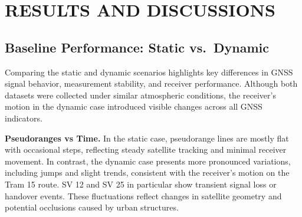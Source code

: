 
\section{RESULTS AND DISCUSSIONS} \label{sec:results}

    \subsection{Baseline Performance: Static vs.\ Dynamic}

        Comparing the static and dynamic scenarios highlights key differences in GNSS signal behavior, measurement stability, and receiver performance. 
        Although both datasets were collected under similar atmospheric conditions, the receiver's motion in the dynamic case introduced visible changes across all GNSS indicators.
    
        \vspace{0.5em}
        \textbf{Pseudoranges vs Time.} 
        In the static case, pseudorange lines are mostly flat with occasional steps, reflecting steady satellite tracking and minimal receiver movement. 
        In contrast, the dynamic case presents more pronounced variations, including jumps and slight trends, consistent with the receiver's motion on the Tram 15 route. 
        SV 12 and SV 25 in particular show transient signal loss or handover events. 
        These fluctuations reflect changes in satellite geometry and potential occlusions caused by urban structures.
        
